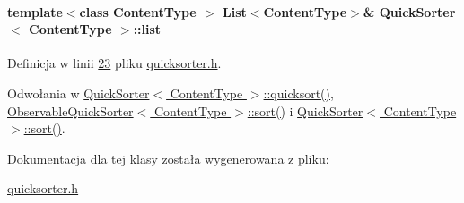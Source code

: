 \hypertarget{class_quick_sorter_a66cd768b6d8a77952f004be7aad87a0e}{
\paragraph[{list}]{\setlength{\rightskip}{0pt plus 5cm}template$<$class Content\-Type $>$ {\bf List}$<$Content\-Type$>$\& {\bf Quick\-Sorter}$<$ Content\-Type $>$\-::list}}\label{class_quick_sorter_a66cd768b6d8a77952f004be7aad87a0e}


Definicja w linii \hyperlink{quicksorter_8h_source_l00023}{23} pliku \hyperlink{quicksorter_8h_source}{quicksorter.\-h}.



Odwołania w \hyperlink{quicksorter_8h_source_l00042}{Quick\-Sorter$<$ Content\-Type $>$\-::quicksort()}, \hyperlink{observablequicksorter_8h_source_l00026}{Observable\-Quick\-Sorter$<$ Content\-Type $>$\-::sort()} i \hyperlink{quicksorter_8h_source_l00067}{Quick\-Sorter$<$ Content\-Type $>$\-::sort()}.



Dokumentacja dla tej klasy została wygenerowana z pliku\-:\begin{DoxyCompactItemize}
\item 
\hyperlink{quicksorter_8h}{quicksorter.\-h}\end{DoxyCompactItemize}
